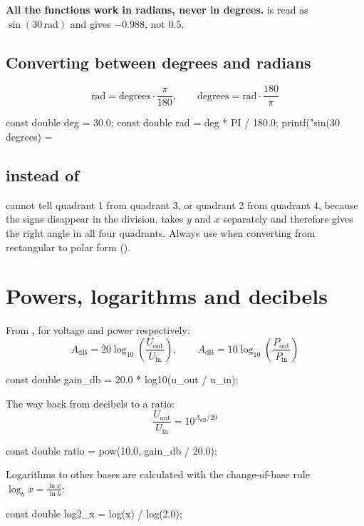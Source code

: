 \textbf{All the functions work in radians, never in degrees.}  is read as
$\sin(30\,\text{rad})$ and gives $-0.988$, not $0.5$.

\subsection{Converting between degrees and radians}
\label{c18:sec:radianer}
\[
  \text{rad} = \text{degrees} \cdot \frac{\pi}{180}, \qquad
  \text{degrees} = \text{rad} \cdot \frac{180}{\pi}
\]
\begin{ccode}
const double deg = 30.0;
const double rad = deg * PI / 180.0;
printf("sin(30 degrees) = %
\end{ccode}

\subsection{ instead of }
\label{c18:sec:atan2}
 cannot tell quadrant 1 from quadrant 3, or quadrant 2 from quadrant 4, because
the signs disappear in the division.  takes $y$ and $x$ separately and therefore
gives the right angle in all four quadrants. Always use  when converting from
rectangular to polar form ().

\section{Powers, logarithms and decibels}
\label{c18:sec:decibel}
From , for voltage and power respectively:
\[
  A_{\text{dB}} = 20\log_{10}\left(\frac{U_{\text{out}}}{U_{\text{in}}}\right), \qquad
  A_{\text{dB}} = 10\log_{10}\left(\frac{P_{\text{out}}}{P_{\text{in}}}\right)
\]
\begin{ccode}
const double gain_db = 20.0 * log10(u_out / u_in);
\end{ccode}
The way back from decibels to a ratio:
\[
  \frac{U_{\text{out}}}{U_{\text{in}}} = 10^{A_{\text{dB}}/20}
\]
\begin{ccode}
const double ratio = pow(10.0, gain_db / 20.0);
\end{ccode}
Logarithms to other bases are calculated with the change-of-base rule
$\log_b x = \frac{\ln x}{\ln b}$:
\begin{ccode}
const double log2_x = log(x) / log(2.0);
\end{ccode}

